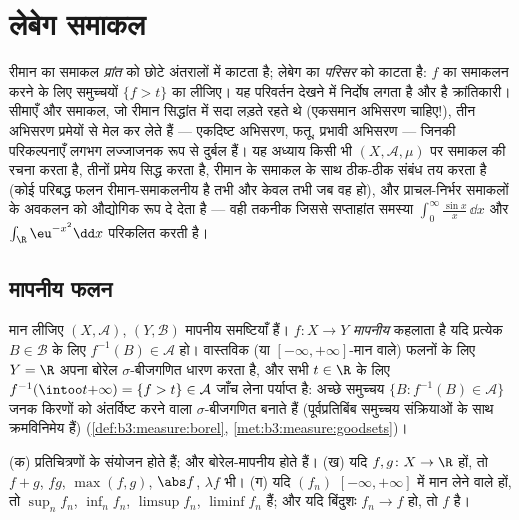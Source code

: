\chapter{लेबेग समाकल}\label{ch:b3:lebesgue}

रीमान का समाकल \emph{प्रांत} को छोटे अंतरालों में काटता है;
लेबेग का \emph{परिसर} को काटता है: $f$ का समाकलन करने के लिए
समुच्चयों $\{f > t\}$ का  लीजिए। यह परिवर्तन देखने में निर्दोष लगता
है और है क्रांतिकारी। सीमाएँ और समाकल, जो रीमान सिद्धांत में सदा
लड़ते रहते थे (एकसमान अभिसरण चाहिए!), तीन अभिसरण प्रमेयों से मेल
कर लेते हैं --- एकदिष्ट अभिसरण, फतू, प्रभावी अभिसरण --- जिनकी
परिकल्पनाएँ लगभग लज्जाजनक रूप से दुर्बल हैं। यह अध्याय किसी भी  $(X, \mathcal A,
\mu)$ पर समाकल की रचना करता है, तीनों प्रमेय सिद्ध करता है,
रीमान के समाकल के साथ ठीक-ठीक संबंध तय करता है (कोई परिबद्ध फलन
रीमान-समाकलनीय है तभी और केवल तभी जब वह   हो), और
प्राचल-निर्भर समाकलों के अवकलन को औद्योगिक रूप दे देता है --- वही
तकनीक जिससे सप्ताहांत समस्या $\int_0^\infty\frac{\sin x}x\,\dd x$ और $\int_\R \eu^{-x^2}\dd x$ परिकलित करती है।

\section{मापनीय फलन}

\begin{definition}\label{def:b3:lebesgue:measurable}
मान लीजिए $(X, \mathcal A)$, $(Y, \mathcal B)$ मापनीय समष्टियाँ हैं। $f \colon X \to Y$
\emph{मापनीय} कहलाता है यदि प्रत्येक $B \in
\mathcal B$ के
लिए $f^{-1}(B) \in \mathcal A$ हो। वास्तविक (या $[-\infty,+\infty]$-मान वाले) फलनों के लिए $Y = \R$ अपना
बोरेल $\sigma$-बीजगणित धारण करता है, और सभी $t \in \R$ के लिए $f^{-1}(\intoo t{+\infty}) = \{f > t\} \in
\mathcal A$ जाँच
लेना पर्याप्त है: अच्छे समुच्चय $\{B :
f^{-1}(B) \in \mathcal A\}$ जनक किरणों को अंतर्विष्ट
करने वाला $\sigma$-बीजगणित बनाते हैं (पूर्वप्रतिबिंब समुच्चय
संक्रियाओं के साथ क्रमविनिमेय हैं) (\cref{def:b3:measure:borel}, \cref{met:b3:measure:goodsets})।
\end{definition}

\begin{proposition}\label{prop:b3:lebesgue:stability}
(क)  प्रतिचित्रणों के संयोजन  होते हैं; और  बोरेल-मापनीय होते हैं।
(ख) यदि $f, g \colon X \to \R$  हों, तो $f + g$, $fg$, $\max(f,g)$, $\abs f$, $\lambda f$ भी।
(ग) यदि $(f_n)$ $[-\infty, +\infty]$ में मान लेने वाले  हों, तो $\sup_nf_n$,
$\inf_nf_n$, $\limsup f_n$, $\liminf f_n$  हैं; और यदि बिंदुशः $f_n \to f$ हो, तो $f$
 है।
\end{proposition}

